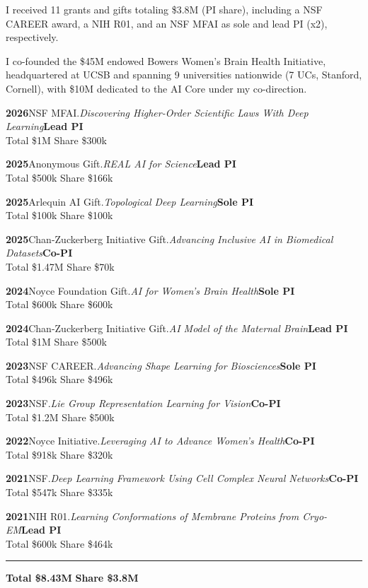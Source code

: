 \newcommand{\mdot}{\,\textperiodcentered\,}
\newcommand{\grant}[5]{%
  \par\addvspace{-2pt}\noindent
  \textbf{#1}\quad #2.\enspace\textit{#3}\hfill\textbf{#4}\\
  \null\hfill{\footnotesize #5}\par}

I received 11 grants and gifts totaling \$3.8M (PI share), including a NSF CAREER award, a NIH R01, and an NSF MFAI as sole and lead PI (x2), respectively. 

I co-founded the \$45M endowed Bowers Women's Brain Health Initiative, headquartered at UCSB and spanning 9 universities nationwide (7 UCs, Stanford, Cornell), with \$10M dedicated to the AI Core under my co-direction.\vspace{3mm}

\grant{2026}{NSF MFAI}{Discovering Higher-Order Scientific Laws With Deep Learning}{Lead PI}{Total \$1M\mdot Share \$300k}
\grant{2025}{Anonymous Gift}{REAL AI for Science}{Lead PI}{Total \$500k\mdot Share \$166k}
\grant{2025}{Arlequin AI Gift}{Topological Deep Learning}{Sole PI}{Total \$100k\mdot Share \$100k}
\grant{2025}{Chan-Zuckerberg Initiative Gift}{Advancing Inclusive AI in Biomedical Datasets}{Co-PI}{Total \$1.47M\mdot Share \$70k}
\grant{2024}{Noyce Foundation Gift}{AI for Women's Brain Health}{Sole PI}{Total \$600k\mdot Share \$600k}
\grant{2024}{Chan-Zuckerberg Initiative Gift}{AI Model of the Maternal Brain}{Lead PI}{Total \$1M\mdot Share \$500k}
\grant{2023}{NSF CAREER}{Advancing Shape Learning for Biosciences}{Sole PI}{Total \$496k\mdot Share \$496k}
\grant{2023}{NSF}{Lie Group Representation Learning for Vision}{Co-PI}{Total \$1.2M\mdot Share \$500k}
\grant{2022}{Noyce Initiative}{Leveraging AI to Advance Women's Health}{Co-PI}{Total \$918k\mdot Share \$320k}
\grant{2021}{NSF}{Deep Learning Framework Using Cell Complex Neural Networks}{Co-PI}{Total \$547k\mdot Share \$335k}
\grant{2021}{NIH R01}{Learning Conformations of Membrane Proteins from Cryo-EM}{Lead PI}{Total \$600k\mdot Share \$464k}

\newcommand{\grantstotal}[2]{%
  \par\addvspace{-10pt}\noindent\hfill\rule{0.32\linewidth}{0.3pt}\par
  \vspace{-3mm}
  \noindent\hfill\textbf{\footnotesize Total #1\mdot Share #2}}

\grantstotal{\$8.43M}{\$3.8M}





 \vspace{-3mm}